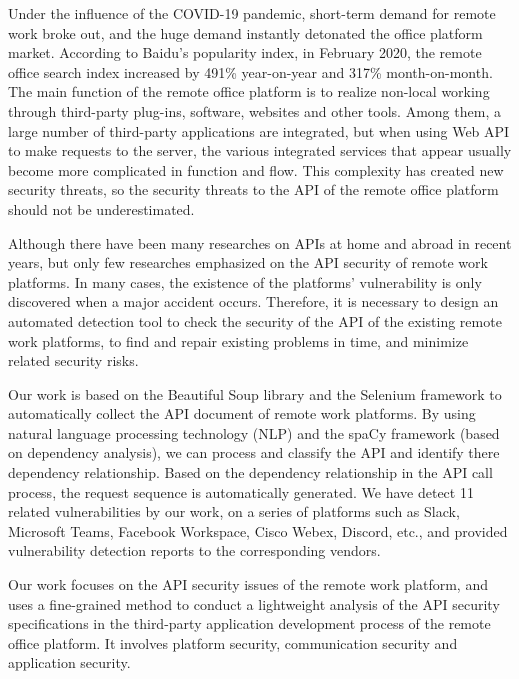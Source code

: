 \documentclass{cumcmthesis}
\begin{document}
\begin{enabstract}
Under the influence of the COVID-19 pandemic, short-term demand for remote work broke out, and the huge demand instantly detonated the office platform market. According to Baidu's popularity index, in February 2020, the remote office search index increased by 491\% year-on-year and 317\% month-on-month. The main function of the remote office platform is to realize non-local working through third-party plug-ins, software, websites and other tools. Among them, a large number of third-party applications are integrated, but when using Web API to make requests to the server, the various integrated services that appear usually become more complicated in function and flow. This complexity has created new security threats, so the security threats to the API of the remote office platform should not be underestimated.

Although there have been many researches on APIs at home and abroad in recent years, but only few researches emphasized on the API security of remote work platforms. In many cases, the existence of the platforms’ vulnerability is only discovered when a major accident occurs. Therefore, it is necessary to design an automated detection tool to check the security of the API of the existing remote work platforms, to find and repair existing problems in time, and minimize related security risks.

Our work is based on the Beautiful Soup library and the Selenium framework to automatically collect the API document of remote work platforms. By using natural language processing technology (NLP) and the spaCy framework (based on dependency analysis), we can process and classify the API and identify there dependency relationship. Based on the dependency relationship in the API call process, the request sequence is automatically generated. We have detect 11 related vulnerabilities by our work, on a series of platforms such as Slack, Microsoft Teams, Facebook Workspace, Cisco Webex, Discord, etc., and provided vulnerability detection reports to the corresponding vendors.

Our work focuses on the API security issues of the remote work platform, and uses a fine-grained method to conduct a lightweight analysis of the API security specifications in the third-party application development process of the remote office platform. It involves platform security, communication security and application security.

	
\end{enabstract}
\end{document}
